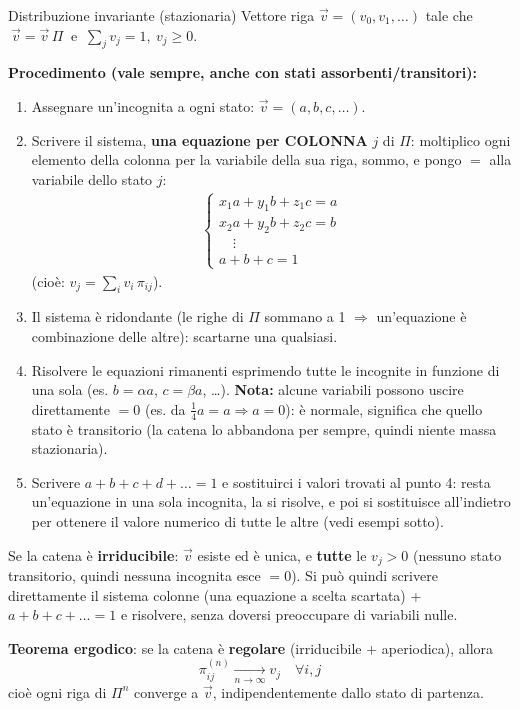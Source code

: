\documentclass[11pt]{article}
\begin{document}
\begin{concetto}[barPurple]{Distribuzione invariante (stazionaria)}
Vettore riga $\vec v=(v_0,v_1,\dots)$ tale che $\ \vec v = \vec v\,\Pi\ $ e $\ \sum_j v_j = 1,\ v_j\ge0$.

\textbf{Procedimento (vale sempre, anche con stati assorbenti/transitori):}
\begin{enumerate}[leftmargin=1.4em,itemsep=1pt,topsep=2pt]
\item Assegnare un'incognita a ogni stato: $\vec v=(a,b,c,\dots)$.
\item Scrivere il sistema, \textbf{una equazione per COLONNA} $j$ di $\Pi$: moltiplico ogni elemento della colonna per la variabile della sua riga, sommo, e pongo $=$ alla variabile dello stato $j$:
\begin{align*}
\begin{cases}
    x_1a+y_1b+z_1c= a\\
    x_2a+y_2b+z_2c=b\\
\quad\vdots\\
    a + b + c = 1
\end{cases}
\end{align*}
(cio\`e: $v_j = \sum_i v_i\,\pi_{ij}$).
\item Il sistema \`e ridondante (le righe di $\Pi$ sommano a 1 $\Rightarrow$ un'equazione \`e combinazione delle altre): scartarne una qualsiasi.
\item Risolvere le equazioni rimanenti esprimendo tutte le incognite in funzione di una sola (es. $b=\alpha a$, $c=\beta a$, \dots). \textbf{Nota:} alcune variabili possono uscire direttamente $=0$ (es. da $\frac14 a=a \Rightarrow a=0$): \`e normale, significa che quello stato \`e transitorio (la catena lo abbandona per sempre, quindi niente massa stazionaria).
\item Scrivere $a+b+c+d+\dots=1$ e sostituirci i valori trovati al punto 4: resta un'equazione in una sola incognita, la si risolve, e poi si sostituisce all'indietro per ottenere il valore numerico di tutte le altre (vedi esempi sotto).
\end{enumerate}

Se la catena \`e \textbf{irriducibile}: $\vec v$ esiste ed \`e unica, e \textbf{tutte} le $v_j>0$ (nessuno stato transitorio, quindi nessuna incognita esce $=0$). Si pu\`o quindi scrivere direttamente il sistema colonne (una equazione a scelta scartata) + $a+b+c+\dots=1$ e risolvere, senza doversi preoccupare di variabili nulle.

\textbf{Teorema ergodico}: se la catena \`e \textbf{regolare} (irriducibile + aperiodica), allora
$$\pi_{ij}^{(n)} \xrightarrow[n\to\infty]{} v_j \quad \forall i,j$$
cio\`e ogni riga di $\Pi^n$ converge a $\vec v$, indipendentemente dallo stato di partenza.


\end{concetto}
\end{document}
